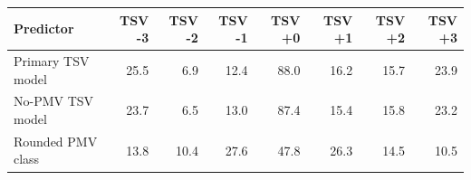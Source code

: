 \begin{tabular}{lrrrrrrr}
\toprule
Predictor & TSV -3 & TSV -2 & TSV -1 & TSV +0 & TSV +1 & TSV +2 & TSV +3 \\
\midrule
Primary TSV model & 25.5 & 6.9 & 12.4 & 88.0 & 16.2 & 15.7 & 23.9 \\
No-PMV TSV model & 23.7 & 6.5 & 13.0 & 87.4 & 15.4 & 15.8 & 23.2 \\
Rounded PMV class & 13.8 & 10.4 & 27.6 & 47.8 & 26.3 & 14.5 & 10.5 \\
\bottomrule
\end{tabular}
